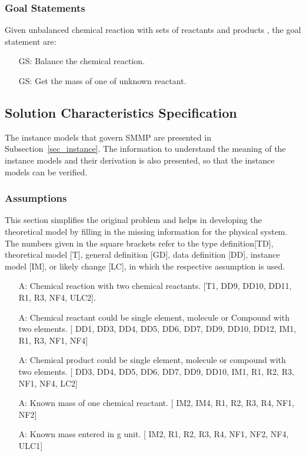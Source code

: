 \documentclass[12pt]{article}
\newcounter{assumpnum} %
\newcounter{goalnum} %
\begin{document}
\subsubsection{Goal Statements}\label{goals}

\noindent Given unbalanced chemical reaction with sets of reactants and products , the goal statement are:

\begin{itemize}
\item[GS\refstepcounter{goalnum}\thegoalnum \label{G1}:] Balance the chemical reaction.
\item[GS\refstepcounter{goalnum}\thegoalnum \label{G2}:] Get the mass of one of unknown reactant.
\end{itemize}

\subsection{Solution Characteristics Specification}


The instance models that govern SMMP are presented in
Subsection~\ref{sec_instance}.  The information to understand the meaning of the
instance models and their derivation is also presented, so that the instance
models can be verified.

\subsubsection{Assumptions} \label{sec_assumpt}

This section simplifies the original problem and helps in developing the
theoretical model by filling in the missing information for the physical
system. The numbers given in the square brackets refer to the  type definition[TD], theoretical model
[T], general definition [GD], data definition [DD], instance model [IM], or
likely change [LC], in which the respective assumption is used.

\begin{itemize}

\item[A\refstepcounter{assumpnum}\theassumpnum \label{Two reactants}:] Chemical reaction with two chemical reactants.  
[T1, DD9, DD10, DD11, R1, R3, NF4, ULC2].
\item[A\refstepcounter{assumpnum}\theassumpnum \label{reactant compound}:] Chemical reactant could be single element, 
molecule or Compound with two elements. [ DD1, DD3, DD4, DD5, DD6, DD7, DD9, DD10, DD12, IM1, R1, R3, NF1, NF4]
\item[A\refstepcounter{assumpnum}\theassumpnum \label{product compound}:] Chemical product could be single element, 
molecule or compound with two elements. [ DD3, DD4, DD5, DD6, DD7, DD9, DD10, IM1, R1, R2, R3, NF1, NF4, LC2]
\item[A\refstepcounter{assumpnum}\theassumpnum \label{Known mass}:] Known mass of one chemical reactant.
[ IM2, IM4, R1, R2, R3, R4, NF1, NF2]
\item[A\refstepcounter{assumpnum}\theassumpnum \label{Mass unit}:] Known mass entered in g unit. 
[ IM2, R1, R2, R3, R4, NF1, NF2, NF4, ULC1]
\end{itemize}
\end{document}
